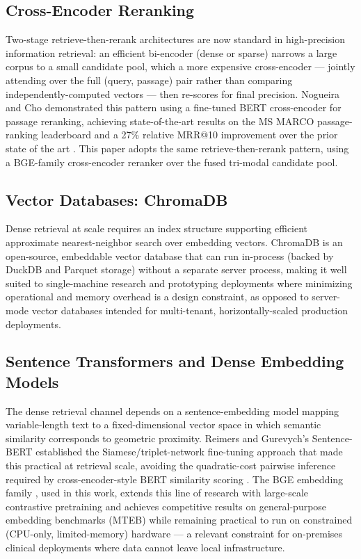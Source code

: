 \documentclass[conference]{IEEEtran}
\begin{document}
\subsection{Cross-Encoder Reranking}
Two-stage retrieve-then-rerank architectures are now standard in high-precision information retrieval: an efficient bi-encoder (dense or sparse) narrows a large corpus to a small candidate pool, which a more expensive cross-encoder --- jointly attending over the full (query, passage) pair rather than comparing independently-computed vectors --- then re-scores for final precision. Nogueira and Cho demonstrated this pattern using a fine-tuned BERT cross-encoder for passage reranking, achieving state-of-the-art results on the MS MARCO passage-ranking leaderboard and a 27\% relative MRR@10 improvement over the prior state of the art \cite{nogueira2019passage}. This paper adopts the same retrieve-then-rerank pattern, using a BGE-family cross-encoder reranker \cite{xiao2023cpack} over the fused tri-modal candidate pool.

\subsection{Vector Databases: ChromaDB}
Dense retrieval at scale requires an index structure supporting efficient approximate nearest-neighbor search over embedding vectors. ChromaDB is an open-source, embeddable vector database that can run in-process (backed by DuckDB and Parquet storage) without a separate server process, making it well suited to single-machine research and prototyping deployments where minimizing operational and memory overhead is a design constraint, as opposed to server-mode vector databases intended for multi-tenant, horizontally-scaled production deployments.

\subsection{Sentence Transformers and Dense Embedding Models}
The dense retrieval channel depends on a sentence-embedding model mapping variable-length text to a fixed-dimensional vector space in which semantic similarity corresponds to geometric proximity. Reimers and Gurevych's Sentence-BERT established the Siamese/triplet-network fine-tuning approach that made this practical at retrieval scale, avoiding the quadratic-cost pairwise inference required by cross-encoder-style BERT similarity scoring \cite{reimers2019sentencebert}. The BGE embedding family \cite{xiao2023cpack}, used in this work, extends this line of research with large-scale contrastive pretraining and achieves competitive results on general-purpose embedding benchmarks (MTEB) while remaining practical to run on constrained (CPU-only, limited-memory) hardware --- a relevant constraint for on-premises clinical deployments where data cannot leave local infrastructure.
\end{document}
